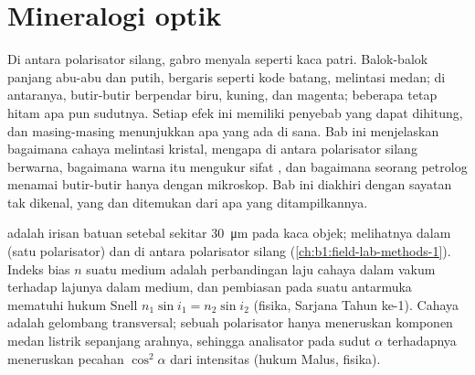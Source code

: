\chapter{Mineralogi optik}\label{ch:b1:optical-mineralogy}

Di antara polarisator silang,  gabro menyala seperti kaca patri. Balok-balok panjang abu-abu dan putih, bergaris seperti kode batang, melintasi medan; di antaranya, butir-butir berpendar biru, kuning, dan magenta; beberapa tetap hitam apa pun sudutnya. Setiap efek ini memiliki penyebab yang dapat dihitung, dan masing-masing menunjukkan  apa yang ada di sana. Bab ini menjelaskan bagaimana cahaya melintasi kristal, mengapa  di antara polarisator silang berwarna, bagaimana warna itu mengukur sifat , dan bagaimana seorang petrolog menamai butir-butir  hanya dengan mikroskop. Bab ini diakhiri dengan sayatan tak dikenal, yang  dan  ditemukan dari apa yang ditampilkannya.

\begin{recall}
 adalah irisan batuan setebal sekitar \qty{30}{\micro m} pada kaca objek;  melihatnya dalam  (satu polarisator) dan di antara polarisator silang (\cref{ch:b1:field-lab-methods-1}). Indeks bias $n$ suatu medium adalah perbandingan laju cahaya dalam vakum terhadap lajunya dalam medium, dan pembiasan pada suatu antarmuka mematuhi hukum Snell $n_1\sin i_1 = n_2\sin i_2$ (fisika, Sarjana Tahun ke-1). Cahaya adalah gelombang transversal; sebuah polarisator hanya meneruskan komponen medan listrik sepanjang arahnya, sehingga analisator pada sudut $\alpha$ terhadapnya meneruskan pecahan $\cos^2\alpha$ dari intensitas (hukum Malus, fisika).
\end{recall}

